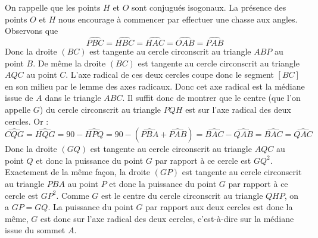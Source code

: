 \begin{sol}
\begin{center}
\end{center}

On rappelle que les points $H$ et $O$ sont conjugués isogonaux. La présence des points $O$ et $H$ nous encourage à commencer par effectuer une chasse aux angles. Observons que
$$\widehat{PBC}=\widehat{HBC}=\widehat{HAC}=\widehat{OAB}=\widehat{PAB}$$ Donc la droite $(BC)$ est tangente au cercle circonscrit au triangle $ABP$ au point $B$. De même la droite $(BC)$ est tangente au cercle circonscrit au triangle $AQC$ au point $C$. L'axe radical de ces deux cercles coupe donc le segment $[BC]$ en son milieu par le lemme des axes radicaux. Donc cet axe radical est la médiane issue de $A$ dans le triangle $ABC$. Il suffit donc de montrer que le centre (que l'on appelle $G$) du cercle circonscrit au triangle $PQH$ est sur l'axe radical des deux cercles. Or :
$$\widehat{CQG}=\widehat{HQG}=90-\widehat{HPQ}=90-(\widehat{PBA}+\widehat{PAB})=\widehat{BAC}-\widehat{QAB}=\widehat{BAC}=\widehat{QAC}$$
Donc la droite $(GQ)$ est tangente au cercle circonscrit au triangle $AQC$ au point $Q$ et donc la puissance du point $G$ par rapport à ce cercle est $GQ^2$. Exactement de la même façon, la droite $(GP)$ est tangente au cercle circonscrit au triangle $PBA$ au point $P$ et donc la puissance du point $G$ par rapport à ce cercle est $GP^2$. Comme $G$ est le centre du cercle circonscrit au triangle $QHP$, on a $GP=GQ$. La puissance du point $G$ par rapport aux deux cercles est donc la même, $G$ est donc sur l'axe radical des deux cercles, c'est-à-dire sur la médiane issue du sommet $A$.
\end{sol}


